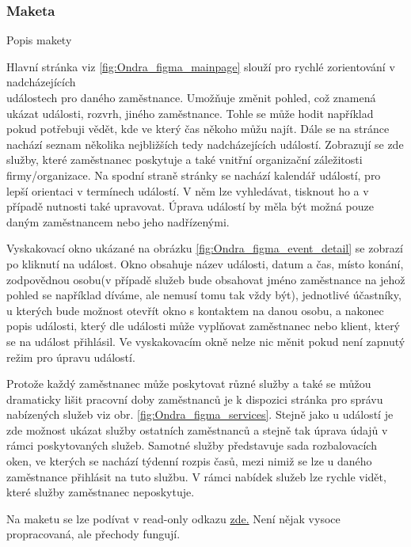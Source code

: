 \subsubsection*{Maketa}

{\noindent\Large Popis makety}

Hlavní stránka viz \ref{fig:Ondra_figma_mainpage} slouží pro rychlé zorientování v nadcházejících\\ událostech pro daného zaměstnance. 
Umožňuje změnit pohled, což znamená ukázat události, rozvrh, jiného zaměstnance. Tohle se může hodit například pokud potřebuji vědět, kde ve který čas někoho můžu najít.
Dále se na stránce nachází seznam několika nejbližších tedy nadcházejících událostí. Zobrazují se zde služby, které zaměstnanec poskytuje a také vnitřní organizační záležitosti firmy/organizace.
Na spodní straně stránky se nachází kalendář událostí, pro lepší orientaci v termínech událostí. V něm lze vyhledávat, tisknout ho a v případě nutnosti také upravovat.
Úprava událostí by měla být možná pouze daným zaměstnancem nebo jeho nadřízenými.

Vyskakovací okno ukázané na obrázku \ref{fig:Ondra_figma_event_detail} se zobrazí po kliknutí na událost.
Okno obsahuje název události, datum a čas, místo konání, zodpovědnou osobu(v případě služeb bude obsahovat jméno zaměstnance 
na jehož pohled se například díváme, ale nemusí tomu tak vždy být), jednotlivé účastníky, u kterých bude možnost otevřít okno s kontaktem na danou osobu, 
a nakonec popis události, který dle události může vyplňovat zaměstnanec nebo klient, který se na událost přihlásil.
Ve vyskakovacím okně nelze nic měnit pokud není zapnutý režim pro úpravu událostí.

Protože každý zaměstnanec může poskytovat různé služby a také se můžou dramaticky 
lišit pracovní doby zaměstnanců je k dispozici stránka pro správu nabízených služeb viz obr. \ref{fig:Ondra_figma_services}.
Stejně jako u událostí je zde možnost ukázat služby ostatních zaměstnanců a stejně tak úprava údajů v rámci poskytovaných služeb.
Samotné služby představuje sada rozbalovacích oken, ve kterých se nachází týdenní rozpis časů, mezi nimiž se lze u daného zaměstnance přihlásit na tuto službu.
V rámci nabídek služeb lze rychle vidět, které služby zaměstnanec neposkytuje. 

Na maketu se lze podívat v read-only odkazu \href{https://www.figma.com/file/h0A4BXg6jb5XL084kGsEIn/ITU---Registra%C4%8Dn%C3%AD-syst%C3%A9m-pro-rehabilita%C4%8Dn%C3%AD-slu%C5%BEby?node-id=64%3A288}{zde.}
Není nějak vysoce propracovaná, ale přechody fungují.

